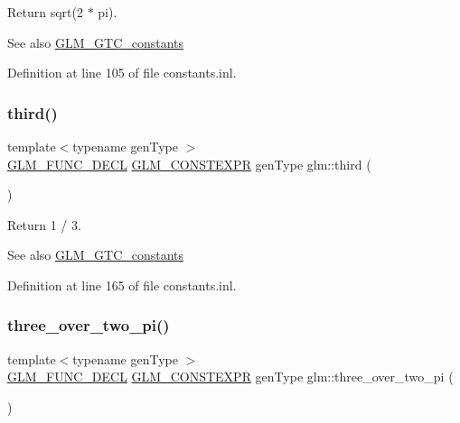 Return sqrt(2 $\ast$ pi). \begin{DoxySeeAlso}{See also}
\mbox{\hyperlink{group__gtc__constants}{G\+L\+M\+\_\+\+G\+T\+C\+\_\+constants}} 
\end{DoxySeeAlso}


Definition at line 105 of file constants.\+inl.

\mbox{\label{group__gtc__constants_ga3077c6311010a214b69ddc8214ec13b5}} 
\subsubsection{\texorpdfstring{third()}{third()}}
{\footnotesize\ttfamily template$<$typename gen\+Type $>$ \\
\mbox{\hyperlink{setup_8hpp_ab2d052de21a70539923e9bcbf6e83a51}{G\+L\+M\+\_\+\+F\+U\+N\+C\+\_\+\+D\+E\+CL}} \mbox{\hyperlink{setup_8hpp_a08b807947b47031d3a511f03f89645ad}{G\+L\+M\+\_\+\+C\+O\+N\+S\+T\+E\+X\+PR}} gen\+Type glm\+::third (\begin{DoxyParamCaption}{ }\end{DoxyParamCaption})}

Return 1 / 3. \begin{DoxySeeAlso}{See also}
\mbox{\hyperlink{group__gtc__constants}{G\+L\+M\+\_\+\+G\+T\+C\+\_\+constants}} 
\end{DoxySeeAlso}


Definition at line 165 of file constants.\+inl.

\mbox{\label{group__gtc__constants_gae94950df74b0ce382b1fc1d978ef7394}} 
\subsubsection{\texorpdfstring{three\_over\_two\_pi()}{three\_over\_two\_pi()}}
{\footnotesize\ttfamily template$<$typename gen\+Type $>$ \\
\mbox{\hyperlink{setup_8hpp_ab2d052de21a70539923e9bcbf6e83a51}{G\+L\+M\+\_\+\+F\+U\+N\+C\+\_\+\+D\+E\+CL}} \mbox{\hyperlink{setup_8hpp_a08b807947b47031d3a511f03f89645ad}{G\+L\+M\+\_\+\+C\+O\+N\+S\+T\+E\+X\+PR}} gen\+Type glm\+::three\+\_\+over\+\_\+two\+\_\+pi (\begin{DoxyParamCaption}{ }\end{DoxyParamCaption})}

